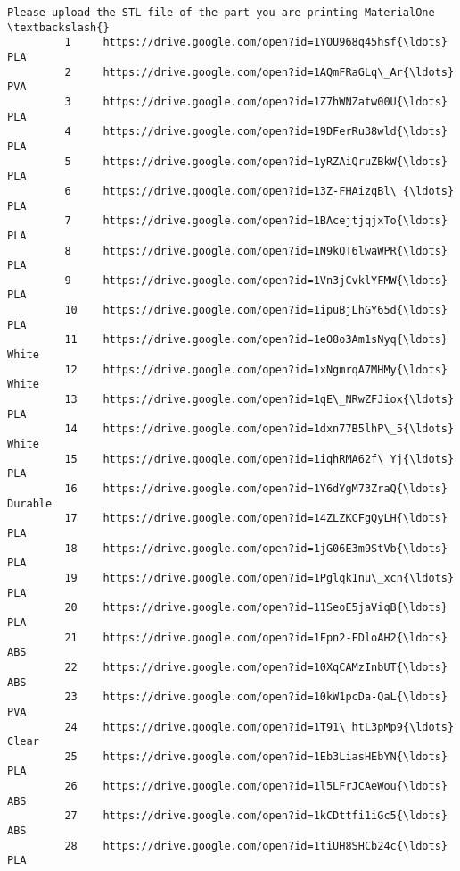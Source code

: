\documentclass[11pt]{article}
\begin{document}
\begin{Verbatim}[commandchars=\\\{\}]
              Please upload the STL file of the part you are printing MaterialOne  \textbackslash{}
         1     https://drive.google.com/open?id=1YOU968q45hsf{\ldots}              PLA   
         2     https://drive.google.com/open?id=1AQmFRaGLq\_Ar{\ldots}              PVA   
         3     https://drive.google.com/open?id=1Z7hWNZatw00U{\ldots}              PLA   
         4     https://drive.google.com/open?id=19DFerRu38wld{\ldots}              PLA   
         5     https://drive.google.com/open?id=1yRZAiQruZBkW{\ldots}              PLA   
         6     https://drive.google.com/open?id=13Z-FHAizqBl\_{\ldots}              PLA   
         7     https://drive.google.com/open?id=1BAcejtjqjxTo{\ldots}              PLA   
         8     https://drive.google.com/open?id=1N9kQT6lwaWPR{\ldots}              PLA   
         9     https://drive.google.com/open?id=1Vn3jCvklYFMW{\ldots}              PLA   
         10    https://drive.google.com/open?id=1ipuBjLhGY65d{\ldots}              PLA   
         11    https://drive.google.com/open?id=1eO8o3Am1sNyq{\ldots}            White   
         12    https://drive.google.com/open?id=1xNgmrqA7MHMy{\ldots}            White   
         13    https://drive.google.com/open?id=1qE\_NRwZFJiox{\ldots}              PLA   
         14    https://drive.google.com/open?id=1dxn77B5lhP\_5{\ldots}            White   
         15    https://drive.google.com/open?id=1iqhRMA62f\_Yj{\ldots}              PLA   
         16    https://drive.google.com/open?id=1Y6dYgM73ZraQ{\ldots}          Durable   
         17    https://drive.google.com/open?id=14ZLZKCFgQyLH{\ldots}              PLA   
         18    https://drive.google.com/open?id=1jG06E3m9StVb{\ldots}              PLA   
         19    https://drive.google.com/open?id=1Pglqk1nu\_xcn{\ldots}              PLA   
         20    https://drive.google.com/open?id=11SeoE5jaViqB{\ldots}              PLA   
         21    https://drive.google.com/open?id=1Fpn2-FDloAH2{\ldots}              ABS   
         22    https://drive.google.com/open?id=10XqCAMzInbUT{\ldots}              ABS   
         23    https://drive.google.com/open?id=10kW1pcDa-QaL{\ldots}              PVA   
         24    https://drive.google.com/open?id=1T91\_htL3pMp9{\ldots}            Clear   
         25    https://drive.google.com/open?id=1Eb3LiasHEbYN{\ldots}              PLA   
         26    https://drive.google.com/open?id=1l5LFrJCAeWou{\ldots}              ABS   
         27    https://drive.google.com/open?id=1kCDttfi1iGc5{\ldots}              ABS   
         28    https://drive.google.com/open?id=1tiUH8SHCb24c{\ldots}              PLA   

\end{Verbatim}
\end{document}
